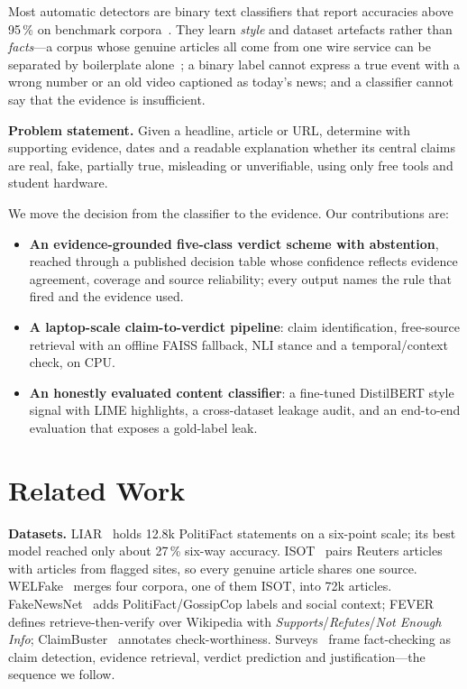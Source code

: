 \documentclass[conference]{IEEEtran}
\begin{document}
Most automatic detectors are binary text classifiers that report accuracies above 95\,\% on benchmark corpora~\cite{verma2021welfake,kaliyar2021fakebert}. They learn \emph{style} and dataset artefacts rather than \emph{facts}---a corpus whose genuine articles all come from one wire service can be separated by boilerplate alone~\cite{ahmed2017isot}; a binary label cannot express a true event with a wrong number or an old video captioned as today's news; and a classifier cannot say that the evidence is insufficient.

\textbf{Problem statement.} Given a headline, article or URL, determine with supporting evidence, dates and a readable explanation whether its central claims are real, fake, partially true, misleading or unverifiable, using only free tools and student hardware.

We move the decision from the classifier to the evidence. Our contributions are:
\begin{itemize}
  \item \textbf{An evidence-grounded five-class verdict scheme with abstention}, reached through a published decision table whose confidence reflects evidence agreement, coverage and source reliability; every output names the rule that fired and the evidence used.
  \item \textbf{A laptop-scale claim-to-verdict pipeline}: claim identification, free-source retrieval with an offline FAISS fallback, NLI stance and a temporal/context check, on CPU.
  \item \textbf{An honestly evaluated content classifier}: a fine-tuned DistilBERT style signal with LIME highlights, a cross-dataset leakage audit, and an end-to-end evaluation that exposes a gold-label leak.
\end{itemize}

\section{Related Work}\label{sec:related}

\textbf{Datasets.} LIAR~\cite{wang2017liar} holds 12.8k PolitiFact statements on a six-point scale; its best model reached only about 27\,\% six-way accuracy. ISOT~\cite{ahmed2017isot} pairs Reuters articles with articles from flagged sites, so every genuine article shares one source. WELFake~\cite{verma2021welfake} merges four corpora, one of them ISOT, into 72k articles. FakeNewsNet~\cite{shu2020fakenewsnet} adds PolitiFact/GossipCop labels and social context; FEVER~\cite{thorne2018fever} defines retrieve-then-verify over Wikipedia with \emph{Supports}/\emph{Refutes}/\emph{Not Enough Info}; ClaimBuster~\cite{arslan2020claimbuster} annotates check-worthiness. Surveys~\cite{zhou2020survey,guo2022survey} frame fact-checking as claim detection, evidence retrieval, verdict prediction and justification---the sequence we follow.
\end{document}
